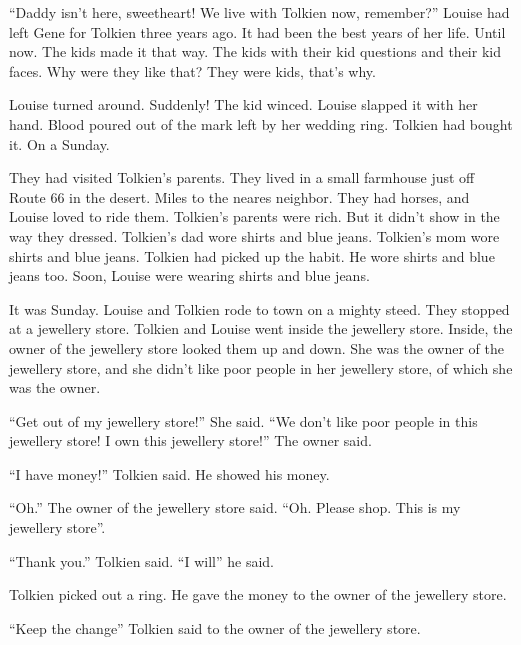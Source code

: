 ``Daddy isn't here, sweetheart! We live with Tolkien now, remember?''
Louise had left Gene for Tolkien three years ago. It had been the
best years of her life. Until now. The kids made it that way. The
kids with their kid questions and their kid faces. Why were they
like that? They were kids, that's why.



Louise turned around. Suddenly! The kid winced. Louise slapped it
with her hand. Blood poured out of the mark left by her wedding
ring. Tolkien had bought it. On a Sunday.



They had visited Tolkien's parents. They lived in a small farmhouse
just off Route 66 in the desert. Miles to the neares neighbor. They
had horses, and Louise loved to ride them. Tolkien's parents were
rich. But it didn't show in the way they dressed. Tolkien's dad
wore shirts and blue jeans. Tolkien's mom wore shirts and blue
jeans. Tolkien had picked up the habit. He wore shirts and blue
jeans too. Soon, Louise were wearing shirts and blue jeans.



It was Sunday. Louise and Tolkien rode to town on a mighty steed.
They stopped at a jewellery store. Tolkien and Louise went inside
the jewellery store. Inside, the owner of the jewellery store
looked them up and down. She was the owner of the jewellery store,
and she didn't like poor people in her jewellery store, of which
she was the owner.



``Get out of my jewellery store!'' She said. ``We don't like poor
people in this jewellery store! I own this jewellery store!'' The
owner said.



``I have money!'' Tolkien said. He showed his money.



``Oh.'' The owner of the jewellery store said. ``Oh. Please shop. This
is my jewellery store''.



``Thank you.'' Tolkien said. ``I will'' he said.



Tolkien picked out a ring. He gave the money to the owner of the
jewellery store.



``Keep the change'' Tolkien said to the owner of the jewellery
store.



